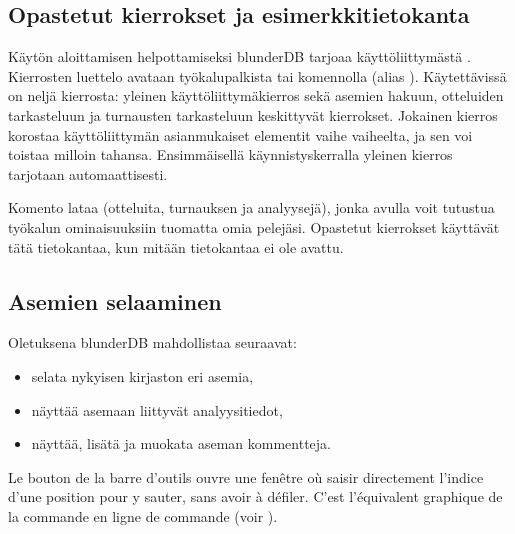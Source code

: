 \documentclass[letterpaper,10pt,finnish]{sphinxmanual}
\begin{document}
\subsection{Opastetut kierrokset ja esimerkkitietokanta}
\label{\detokenize{manuel:visites-guidees-et-base-d-exemple}}\label{\detokenize{manuel:visites-guidees}}
\sphinxAtStartPar
Käytön aloittamisen helpottamiseksi blunderDB tarjoaa käyttöliittymästä . Kierrosten luettelo avataan työkalupalkista tai komennolla  (alias ). Käytettävissä on neljä kierrosta: yleinen käyttöliittymäkierros sekä asemien hakuun, otteluiden tarkasteluun ja turnausten tarkasteluun keskittyvät kierrokset. Jokainen kierros korostaa käyttöliittymän asianmukaiset elementit vaihe vaiheelta, ja sen voi toistaa milloin tahansa. Ensimmäisellä käynnistyskerralla yleinen kierros tarjotaan automaattisesti.

\sphinxAtStartPar
Komento  lataa  (otteluita, turnauksen ja analyysejä), jonka avulla voit tutustua työkalun ominaisuuksiin tuomatta omia pelejäsi. Opastetut kierrokset käyttävät tätä tietokantaa, kun mitään tietokantaa ei ole avattu.


\subsection{Asemien selaaminen}
\label{\detokenize{manuel:navigation-dans-les-positions}}\label{\detokenize{manuel:navigation-positions}}
\sphinxAtStartPar
Oletuksena blunderDB mahdollistaa seuraavat:
\begin{itemize}
\item {} 
\sphinxAtStartPar
selata nykyisen kirjaston eri asemia,

\item {} 
\sphinxAtStartPar
näyttää asemaan liittyvät analyysitiedot,

\item {} 
\sphinxAtStartPar
näyttää, lisätä ja muokata aseman kommentteja.

\end{itemize}

\sphinxAtStartPar
Le bouton  de la barre d’outils ouvre une fenêtre où
saisir directement l’indice d’une position pour y sauter, sans avoir à
défiler. C’est l’équivalent graphique de la commande \sphinxcode{\sphinxupquote{{[}number{]}}} en ligne de
commande (voir {\hyperref[\detokenize{cmd_mode:cmd-positions}]{}}).
\end{document}
